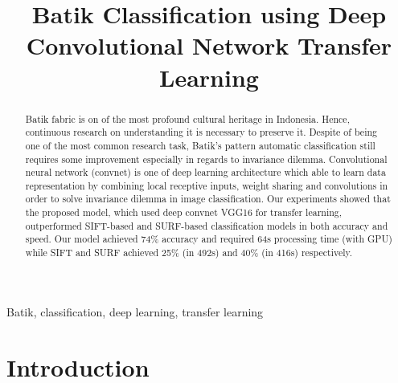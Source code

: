 \documentclass[conference]{IEEEtran}
\begin{document}
%
\title{Batik Classification using Deep Convolutional Network Transfer Learning}


\author{

\and
{}

}

\maketitle


\begin{abstract}
Batik fabric is on of the most profound cultural heritage in Indonesia. Hence, continuous research on understanding it is necessary to preserve it. Despite of being one of the most common research task, Batik's pattern automatic classification still requires some improvement especially in regards to invariance dilemma. Convolutional neural network (convnet) is one of deep learning architecture which able to learn data representation by combining local receptive inputs, weight sharing and convolutions in order to solve invariance dilemma in image classification. Our experiments showed that the proposed model, which used deep convnet VGG16 for transfer learning, outperformed SIFT-based and SURF-based classification models in both accuracy and speed. Our model achieved 74\% accuracy and required 64s processing time (with GPU) while SIFT and SURF achieved 25\% (in 492s) and 40\% (in 416s) respectively. 
\end{abstract}

\begin{IEEEkeywords}
Batik, classification, deep learning, transfer learning
\end{IEEEkeywords}

\section{Introduction}
\end{document}
